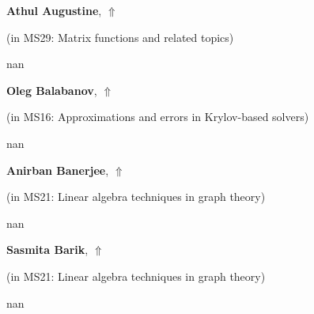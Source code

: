 \documentclass[ILAS2025-program.tex]{subfiles}
\begin{document}
     \hypertarget{down0158}{}\begin{ilasabstract}
    
    \textbf{Athul Augustine},  \hfill \hyperlink{up0158}{$\Uparrow$}
    
    (in {\color{mstitle}MS29: Matrix functions and related topics})
        
        \mtskip
    nan\end{ilasabstract}
     \hypertarget{down0344}{}\begin{ilasabstract}
    
    \textbf{Oleg Balabanov},  \hfill \hyperlink{up0344}{$\Uparrow$}
    
    (in {\color{mstitle}MS16: Approximations and errors in Krylov-based solvers})
        
        \mtskip
    nan\end{ilasabstract}
     \hypertarget{down0381}{}\begin{ilasabstract}
    
    \textbf{Anirban Banerjee},  \hfill \hyperlink{up0381}{$\Uparrow$}
    
    (in {\color{mstitle}MS21: Linear algebra techniques in graph theory})
        
        \mtskip
    nan\end{ilasabstract}
     \hypertarget{down0336}{}\begin{ilasabstract}
    
    \textbf{Sasmita Barik},  \hfill \hyperlink{up0336}{$\Uparrow$}
    
    (in {\color{mstitle}MS21: Linear algebra techniques in graph theory})
        
        \mtskip
    nan\end{ilasabstract}
\end{document}
